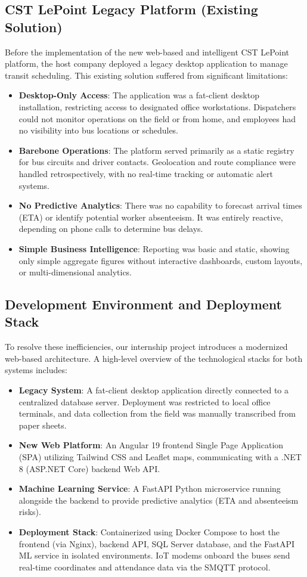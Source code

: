 \subsection{CST LePoint Legacy Platform (Existing Solution)}
\label{subsec:legacy_solution}
Before the implementation of the new web-based and intelligent CST LePoint platform, the host company deployed a legacy desktop application to manage transit scheduling. This existing solution suffered from significant limitations:
\begin{itemize}
  \item \textbf{Desktop-Only Access}: The application was a fat-client desktop installation, restricting access to designated office workstations. Dispatchers could not monitor operations on the field or from home, and employees had no visibility into bus locations or schedules.
  \item \textbf{Barebone Operations}: The platform served primarily as a static registry for bus circuits and driver contacts. Geolocation and route compliance were handled retrospectively, with no real-time tracking or automatic alert systems.
  \item \textbf{No Predictive Analytics}: There was no capability to forecast arrival times (ETA) or identify potential worker absenteeism. It was entirely reactive, depending on phone calls to determine bus delays.
  \item \textbf{Simple Business Intelligence}: Reporting was basic and static, showing only simple aggregate figures without interactive dashboards, custom layouts, or multi-dimensional analytics.
\end{itemize}

\subsection{Development Environment and Deployment Stack}
\label{subsec:dev_and_deployment}
To resolve these inefficiencies, our internship project introduces a modernized web-based architecture. A high-level overview of the technological stacks for both systems includes:
\begin{itemize}
  \item \textbf{Legacy System}: A fat-client desktop application directly connected to a centralized database server. Deployment was restricted to local office terminals, and data collection from the field was manually transcribed from paper sheets.
  \item \textbf{New Web Platform}: An Angular 19 frontend Single Page Application (SPA) utilizing Tailwind CSS and Leaflet maps, communicating with a .NET 8 (ASP.NET Core) backend Web API.
  \item \textbf{Machine Learning Service}: A FastAPI Python microservice running alongside the backend to provide predictive analytics (ETA and absenteeism risks).
  \item \textbf{Deployment Stack}: Containerized using Docker Compose to host the frontend (via Nginx), backend API, SQL Server database, and the FastAPI ML service in isolated environments. IoT modems onboard the buses send real-time coordinates and attendance data via the SMQTT protocol.
\end{itemize}

